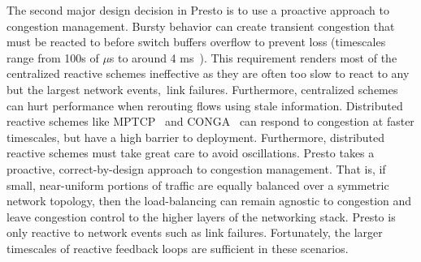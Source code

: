  The second major design decision in 
Presto is to use a proactive approach to congestion management. Bursty 
behavior can create transient congestion that must be reacted to 
before switch buffers overflow to prevent loss (timescales range from 100s of $\mu$s 
to around 4 ms~\cite{planck}). This requirement renders most of the centralized reactive schemes ineffective
as they are often too slow to react to any but the largest network events,~\eg{}link failures. 
Furthermore, centralized schemes can hurt performance when rerouting
flows using stale information.
Distributed reactive schemes like MPTCP~\cite{mptcp} and 
CONGA~\cite{conga} can respond to congestion at faster timescales, but have a high barrier to deployment.
Furthermore, distributed reactive schemes must take great care to avoid oscillations.
Presto takes a proactive, correct-by-design approach to congestion management. 
That is, if small, near-uniform portions of traffic are equally
balanced over a symmetric network topology, then the load-balancing can remain agnostic to congestion and
leave congestion control to the higher layers of the networking stack.
Presto is only reactive to network events such as link failures. Fortunately, 
the larger timescales of reactive feedback loops are sufficient in these scenarios. 

